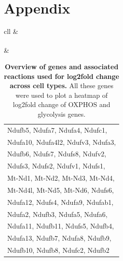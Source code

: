 \chapter{Appendix}
\label{chap:supp}


\begin{table}[H]
    \centering
    \caption{\textbf{Overview of genes and associated reactions used for log2fold change across cell types.}
    All these genes were used to plot a heatmap of log2fold change of OXPHOS and glycolysis genes.}
    \label{tab:all_log2}
    \begin{tabular}{cll}
                                                                                              &                                                                                                                                                                                                                                                                                                                                                                                         \\ \hline
                                                                                                                                                                                                                                                                                                                                                                                                                                                                                                                                      \\ \hline
                               & \begin{tabular}[c]{@{}l@{}}Ndufb5, Ndufa7, Ndufa4, Ndufc1,\\ Ndufa10, Ndufa4l2, Ndufv3, Ndufa3,\\ Ndufb6, Ndufs7, Ndufs8, Ndufv2,\\ Ndufs3, Ndufs2, Ndufv1, Ndufs1,\\ Mt-Nd1, Mt-Nd2, Mt-Nd3, Mt-Nd4,\\ Mt-Nd4l, Mt-Nd5, Mt-Nd6, Ndufs6,\\ Ndufa12, Ndufs4, Ndufa9, Ndufab1,\\ Ndufa2, Ndufb3, Ndufa5, Ndufa6,\\ Ndufa11, Ndufb11, Ndufs5, Ndufb4,\\ Ndufa13, Ndufb7, Ndufa8, Ndufb9,\\ Ndufb10, Ndufb8, Ndufc2, Ndufb2\end{tabular} \\ \hline

\end{tabular}
\end{table}
